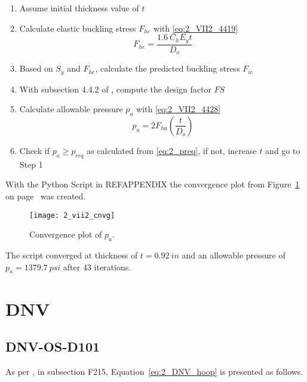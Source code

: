\begin{enumerate}
	\item Assume initial thickness value of $t$
	\item Calculate elastic buckling stress $F_{he}$ with \ref{eq:2_VII2_4419}
		\begin{equation}
			\label{eq:2_VII2_4419}
			F_{he} = \frac{1.6\ C_h E_y t}{D_o}
		\end{equation}
	\item Based on $S_y$ and $F_{he}$, calculate the predicted buckling stress $F_{ic}$
	\item With subsection 4.4.2 of \citep{ASMEbvpcVII2}, compute the design factor $FS$
	\item Calculate allowable pressure $p_a$ with \ref{eq:2_VII2_4428}
		\begin{equation}
			\label{eq:2_VII2_4428}
			p_a = 2 F_{ha} \left(\frac{t}{D_o}\right)
		\end{equation}
	\item Check if $p_a \geq p_{req}$ as calculated from \ref{eq:2_preq}, if not, increase $t$ and go to Step 1 \\
	
\end{enumerate}

With the Python Script in REFAPPENDIX the convergence plot from Figure~\ref{fig:2_vii2_cnvg} on page~\pageref{fig:2_vii2_cnvg} was created.
\begin{figure}[!htbp]
    \centering
    \texttt{[image: 2\_vii2\_cnvg]}
    \caption{Convergence plot of $p_a$.}
    \label{fig:2_vii2_cnvg}
\end{figure}

The script converged at thickness of $t = 0.92\ in$ and an allowable pressure of $p_a = 1379.7\ psi$ after 43 iterations. 


\section{DNV}

\subsection{DNV-OS-D101}

As per \citep{DNVOSD101}, in subsection F215, Equation~\ref{eq:2_DNV_hoop} is presented as follows.

